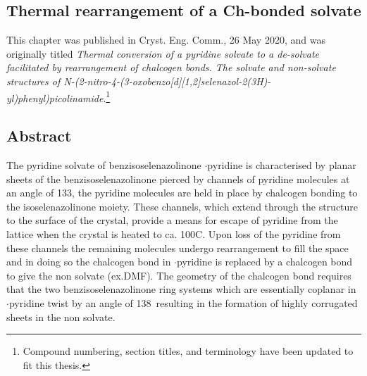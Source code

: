 \begin{refsection}

    
    \chapter{Thermal rearrangement of a Ch-bonded solvate}\label{ch:thermal-conversion}
    
    This chapter was published in Cryst. Eng. Comm., 26 May 2020, and was originally titled \emph{Thermal conversion of a pyridine solvate to a de-solvate facilitated by rearrangement of chalcogen bonds. The solvate and non-solvate structures of N-(2-nitro-4-(3-oxobenzo[\emph{d}][1,2]selenazol-2(3\emph{H})-yl)phenyl)picolinamide}\autocite{Fellowes2020a}.\footnote{Compound numbering, section titles, and terminology have been updated to fit this thesis.}
    
    \section{Abstract}
    The pyridine solvate of benzisoselenazolinone $\cdot$pyridine is characterised by planar sheets of the benzisoselenazolinone  pierced by channels of pyridine molecules at an angle of 133\degree, the pyridine molecules are held in place by  chalcogen bonding to the isoselenazolinone moiety.
    These channels, which extend through the structure to the surface of the crystal, provide a means for escape of pyridine from the lattice when the crystal is heated to ca. 100\degree{}C.
    Upon loss of the pyridine from these channels the remaining molecules undergo rearrangement to fill the space and in doing so the  chalcogen bond in $\cdot$pyridine is replaced by a  chalcogen bond to give the non solvate (ex.DMF).
    The geometry of the chalcogen bond requires that the two benzisoselenazolinone ring systems which are essentially coplanar in $\cdot$pyridine twist by an angle of 138\degree~resulting in the formation of highly corrugated sheets in the non solvate.
    

\end{refsection}
